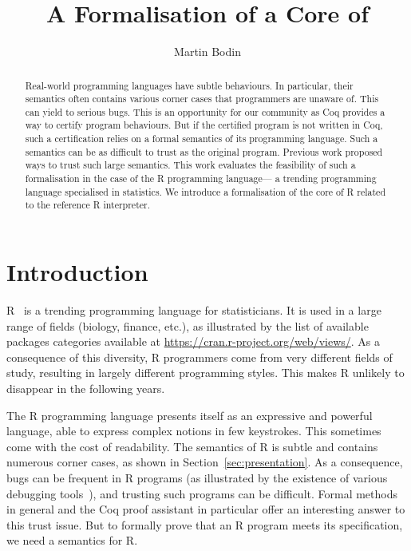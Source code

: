 \documentclass[9pt, sigplan, natbib=false, screen=true]{acmart}
\title{A \Coq{} Formalisation of a Core of \R{}}
\author{Martin Bodin}
\affiliation{
    \institution{Center of Mathematical Modeling}
    \streetaddress{Beauchef 851}
    \city{Santiago}
    \country{Chile}
}
\newcommand\Coq{Coq}
\newcommand\R{R}
\begin{document}
\begin{abstract}
Real-world programming languages have subtle behaviours.
In particular, their semantics often contains various corner cases
that programmers are unaware of.
This can yield to serious bugs.
This is an opportunity for our community
as \Coq{} provides a way to certify program behaviours.
But if the certified program is not written in \Coq{},
such a certification relies on a formal semantics of its programming language.
Such a semantics can be as difficult to trust as the original program.
Previous work proposed ways to trust such large semantics.
This work evaluates the feasibility of such a formalisation
in the case of the \R{} programming language---%
a trending programming language specialised in statistics.
We introduce a formalisation of the core of \R{}
related to the reference \R{} interpreter.
\end{abstract}

\maketitle

\section{Introduction}
\label{sec:introduction}

\R{}~\parencite{ihaka1996r, Rwebsite} is a trending
programming language for statisticians.
It is used in a large range of fields (biology, finance, etc.),
as illustrated by the list of available packages categories
available at
\url{https://cran.r-project.org/web/views/}.
As a consequence of this diversity,
\R{} programmers come from very different fields of study,
resulting in largely different programming styles.
This makes \R{} unlikely to disappear
in the following years.

The \R{} programming language presents itself
as an expressive and powerful language,
able to express complex notions in few keystrokes.
This sometimes come with the cost of readability.
The semantics of \R{} is subtle
and contains numerous corner cases,
as shown in Section~\ref{sec:presentation}.
%
As a consequence, bugs can be frequent in \R{} programs
(as illustrated by the existence of various debugging tools~\parencite{mcpherson2014}),
and trusting such programs can be difficult.
Formal methods in general and the \Coq{} proof assistant in particular
offer an interesting answer to this trust issue.
But to formally prove that an \R{} program meets its specification,
we need a semantics for \R{}.
\end{document}

